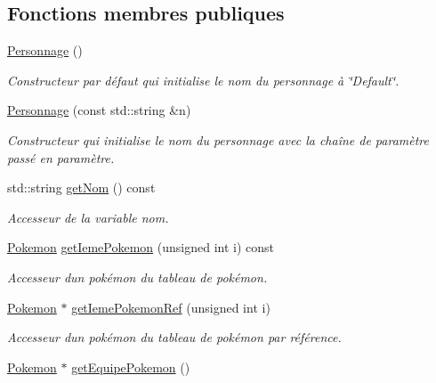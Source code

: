 \subsection*{Fonctions membres publiques}
\begin{DoxyCompactItemize}
\item 
\mbox{\label{class_personnage_abec36eb0310adc71f3375297fc590c65}} 
\hyperlink{class_personnage_abec36eb0310adc71f3375297fc590c65}{Personnage} ()
\begin{DoxyCompactList}\small\item\em Constructeur par défaut qui initialise le nom du personnage à \char`\"{}\+Default\char`\"{}. \end{DoxyCompactList}\item 
\hyperlink{class_personnage_a5aaac2a4ab4d33e721c3d118de4e9785}{Personnage} (const std\+::string \&n)
\begin{DoxyCompactList}\small\item\em Constructeur qui initialise le nom du personnage avec la chaîne de paramètre passé en paramètre. \end{DoxyCompactList}\item 
std\+::string \hyperlink{class_personnage_a411597dd00afced2f6eeb70461833dbe}{get\+Nom} () const
\begin{DoxyCompactList}\small\item\em Accesseur de la variable nom. \end{DoxyCompactList}\item 
\hyperlink{class_pokemon}{Pokemon} \hyperlink{class_personnage_abd45dd4e1a4099a6300c037fc41e1037}{get\+Ieme\+Pokemon} (unsigned int i) const
\begin{DoxyCompactList}\small\item\em Accesseur d\textquotesingle{}un pokémon du tableau de pokémon. \end{DoxyCompactList}\item 
\hyperlink{class_pokemon}{Pokemon} $\ast$ \hyperlink{class_personnage_aeab0448ba1e833d57ee17827e3a6ac0d}{get\+Ieme\+Pokemon\+Ref} (unsigned int i)
\begin{DoxyCompactList}\small\item\em Accesseur d\textquotesingle{}un pokémon du tableau de pokémon par référence. \end{DoxyCompactList}\item 
\hyperlink{class_pokemon}{Pokemon} $\ast$ \hyperlink{class_personnage_a853a057817adeacdf048534cf30254d2}{get\+Equipe\+Pokemon} ()

\end{DoxyCompactItemize}
